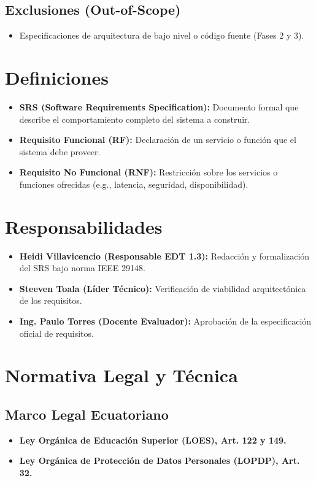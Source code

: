 \documentclass[12pt,a4paper]{article}
\begin{document}
\subsection{Exclusiones (Out-of-Scope)}
\begin{itemize}[leftmargin=1.5em, itemsep=2pt]
    \item Especificaciones de arquitectura de bajo nivel o código fuente (Fases 2 y 3).
\end{itemize}

\section{Definiciones}
\begin{itemize}[leftmargin=1.5em, itemsep=2pt]
    \item \textbf{SRS (Software Requirements Specification):} Documento formal que describe el comportamiento completo del sistema a construir.
    \item \textbf{Requisito Funcional (RF):} Declaración de un servicio o función que el sistema debe proveer.
    \item \textbf{Requisito No Funcional (RNF):} Restricción sobre los servicios o funciones ofrecidas (e.g., latencia, seguridad, disponibilidad).
\end{itemize}

\section{Responsabilidades}
\begin{itemize}[leftmargin=1.5em, itemsep=2pt]
    \item \textbf{Heidi Villavicencio (Responsable EDT 1.3):} Redacción y formalización del SRS bajo norma IEEE 29148.
    \item \textbf{Steeven Toala (Líder Técnico):} Verificación de viabilidad arquitectónica de los requisitos.
    \item \textbf{Ing. Paulo Torres (Docente Evaluador):} Aprobación de la especificación oficial de requisitos.
\end{itemize}

\section{Normativa Legal y Técnica}
\subsection{Marco Legal Ecuatoriano}
\begin{itemize}[leftmargin=1.5em, itemsep=2pt]
    \item \textbf{Ley Orgánica de Educación Superior (LOES), Art. 122 y 149.}
    \item \textbf{Ley Orgánica de Protección de Datos Personales (LOPDP), Art. 32.}
\end{itemize}
\end{document}
